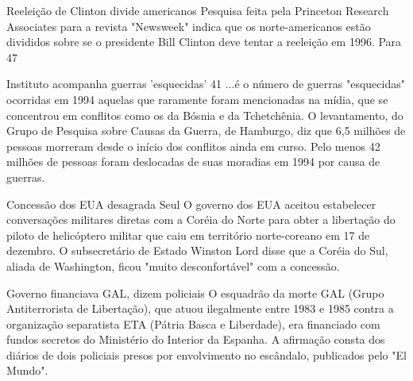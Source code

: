 Reeleição de Clinton divide americanos 
Pesquisa feita pela Princeton Research Associates para a revista "Newsweek" indica que os norte-americanos estão divididos sobre se o presidente Bill Clinton deve tentar a reeleição em 1996. Para 47%

Instituto acompanha guerras 'esquecidas' 
41 ...é o número de guerras "esquecidas" ocorridas em 1994 aquelas que raramente foram mencionadas na mídia, que se concentrou em conflitos como os da Bósnia e da Tchetchênia. O levantamento, do Grupo de Pesquisa sobre Causas da Guerra, de Hamburgo, diz que 6,5 milhões de pessoas morreram desde o início dos conflitos ainda em curso. Pelo menos 42 milhões de pessoas foram deslocadas de suas moradias em 1994 por causa de guerras. 

Concessão dos EUA desagrada Seul 
O governo dos EUA aceitou estabelecer conversações militares diretas com a Coréia do Norte para obter a libertação do piloto de helicóptero militar que caiu em território norte-coreano em 17 de dezembro. O subsecretário de Estado Winston Lord disse que a Coréia do Sul, aliada de Washington, ficou "muito desconfortável" com a concessão. 

Governo financiava GAL, dizem policiais 
O esquadrão da morte GAL (Grupo Antiterrorista de Libertação), que atuou ilegalmente entre 1983 e 1985 contra a organização separatista ETA (Pátria Basca e Liberdade), era financiado com fundos secretos do Ministério do Interior da Espanha. A afirmação consta dos diários de dois policiais presos por envolvimento no escândalo, publicados pelo "El Mundo". 

